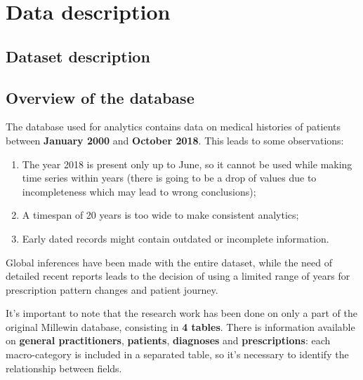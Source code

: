 \chapter{Data description}

\section{Dataset description}

\section{Overview of the database}
The database used for analytics contains data on medical histories of patients between \textbf{January 2000} and \textbf{October 2018}. This leads to some observations:
\begin{enumerate}
	\item The year 2018 is present only up to June, so it cannot be used while making time series within years (there is going to be a drop of values due to incompleteness which may lead to wrong conclusions);
	\item A timespan of 20 years is too wide to make consistent analytics;
	\item Early dated records might contain outdated or incomplete information.
\end{enumerate}

Global inferences have been made with the entire dataset, while the need of detailed recent reports leads to the decision of using a limited range of years for prescription pattern changes and patient journey.

It's important to note that the research work has been done on only a part of the original Millewin database, consisting in \textbf{4 tables}. There is information available on \textbf{general practitioners}, \textbf{patients}, \textbf{diagnoses} and \textbf{prescriptions}: each macro-category is included in a separated table, so it's necessary to identify the relationship between fields.

